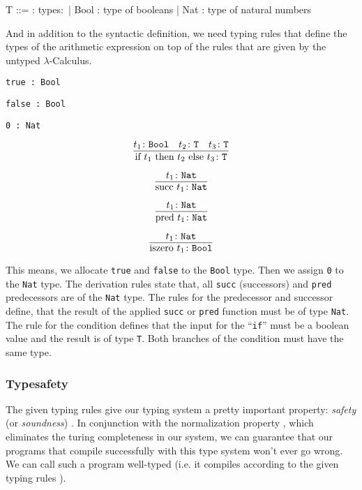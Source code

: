 \begin{bnfgrammar}
    T ::= : types$\colon$
    | Bool : type of booleans
    | Nat : type of natural numbers
\end{bnfgrammar}

And in addition to the syntactic definition, we need typing rules
that define the types of the arithmetic expression on top of
the rules that are given by the untyped $\lambda$-Calculus.

\begin{center}
    \texttt{true : Bool}
    
    \texttt{false : Bool}
    
    \texttt{0 : Nat}
\end{center}

\[\infer{ \text{if } t_1 \text{ then } t_2 \text{ else } t_3 \colon \texttt{T} }{ t_1 \colon \texttt{Bool} & t_2 \colon \texttt{T} & t_3 \colon \texttt{T} }\]

\[\infer{ \text{succ } t_1 \colon \texttt{Nat} }{ t_1 \colon \texttt{Nat} }\]

\[\infer{ \text{pred } t_1 \colon \texttt{Nat} }{ t_1 \colon \texttt{Nat} }\]

\[\infer{ \text{iszero } t_1 \colon \texttt{Bool} }{ t_1 \colon \texttt{Nat} }\]

This means, we allocate \texttt{true} and \texttt{false} to the \texttt{Bool} type.
Then we assign \texttt{0} to the \texttt{Nat} type. 
The derivation rules state that, all \texttt{succ} (successors) and \texttt{pred} predecessors are of the
\texttt{Nat} type. The rules for the predecessor and successor define, that the result
of the applied \texttt{succ} or \texttt{pred} function must be of type \texttt{Nat}. The rule for the condition
defines that the input for the ``\texttt{if}'' must be a boolean value and the result is
of type \texttt{T}. Both branches of the condition must have the same type.

\subsubsection{Typesafety}

The given typing rules give our typing system a pretty important property:
\textit{safety} (or \textit{soundness}) \cite{pierce2002ProgLang}.
In conjunction with the normalization property \cite{pierce2002ProgLang} \cite{baader_nipkow_1998},
which eliminates the turing completeness in our system, we can guarantee that our programs
that compile successfully with this type system won't ever go wrong. We can call
such a program well-typed (i.e. it compiles according to the given typing rules \cite{cardelliTypeSystems}).

